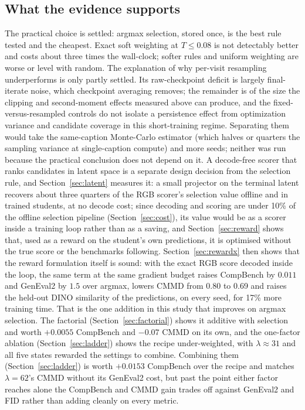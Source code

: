 \documentclass[11pt,a4paper]{article}
\begin{document}
\subsection{What the evidence supports}
The practical choice is settled: argmax selection, stored once, is the best rule tested and the cheapest. Exact soft weighting at $T\le0.08$ is not detectably better and costs about three times the wall-clock; softer rules and uniform weighting are worse or level with random. The explanation of why per-visit resampling underperforms is only partly settled. Its raw-checkpoint deficit is largely final-iterate noise, which checkpoint averaging removes; the remainder is of the size the clipping and second-moment effects measured above can produce, and the fixed-versus-resampled controls do not isolate a persistence effect from optimization variance and candidate coverage in this short-training regime. Separating them would take the same-caption Monte-Carlo estimator (which halves or quarters the sampling variance at single-caption compute) and more seeds; neither was run because the practical conclusion does not depend on it. A decode-free scorer that ranks candidates in latent space is a separate design decision from the selection rule, and Section~\ref{sec:latent} measures it: a small projector on the terminal latent recovers about three quarters of the RGB scorer's selection value offline and in trained students, at no decode cost; since decoding and scoring are under 10\% of the offline selection pipeline (Section~\ref{sec:cost}), its value would be as a scorer inside a training loop rather than as a saving, and Section~\ref{sec:reward} shows that, used as a reward on the student's own predictions, it is optimised without the true score or the benchmarks following. Section~\ref{sec:rewardx} then shows that the reward formulation itself is sound: with the exact RGB score decoded inside the loop, the same term at the same gradient budget raises CompBench by $0.011$ and GenEval2 by $1.5$ over argmax, lowers CMMD from 0.80 to 0.69 and raises the held-out DINO similarity of the predictions, on every seed, for 17\% more training time. That is the one addition in this study that improves on argmax selection. The factorial (Section~\ref{sec:factorial}) shows it additive with selection and worth $+0.0055$ CompBench and $-0.07$ CMMD on its own, and the one-factor ablation (Section~\ref{sec:ladder}) shows the recipe under-weighted, with $\lambda\approx31$ and all five states rewarded the settings to combine. Combining them (Section~\ref{sec:ladder}) is worth $+0.0153$ CompBench over the recipe and matches $\lambda=62$'s CMMD without its GenEval2 cost, but past the point either factor reaches alone the CompBench and CMMD gain trades off against GenEval2 and FID rather than adding cleanly on every metric.
\end{document}
